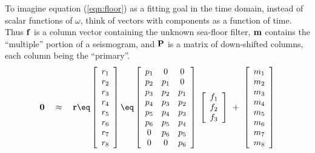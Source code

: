 \par
To imagine equation (\ref{eqn:floor})
as a fitting goal in the time domain,
instead of scalar functions of $\omega$,
think of vectors with components as a function of time.
Thus $\bold f$ is a column vector
containing the unknown sea-floor filter,
$\bold m$ 
contains the ``multiple'' portion of a seismogram,
and $\bold P$ is a matrix of down-shifted columns,
each column being the ``primary''.
\begin{equation}
\bold 0 \quad\approx\quad
\bold r \eq
\left[
\begin{array}{c}
  r_1 \\
  r_2 \\
  r_3 \\
  r_4 \\
  r_5 \\
  r_6 \\
  r_7 \\
  r_8
  \end{array} \right]
  \eq
\left[
\begin{array}{ccc}
  p_1 & 0   & 0    \\
  p_2 & p_1 & 0    \\
  p_3 & p_2 & p_1  \\
  p_4 & p_3 & p_2  \\
  p_5 & p_4 & p_3  \\
  p_6 & p_5 & p_4  \\
  0   & p_6 & p_5  \\
  0   & 0   & p_6
  \end{array} \right]
\; \left[
\begin{array}{c}
  f_1 \\
  f_2 \\
  f_3 \end{array} \right]
\ +\ 
\left[
\begin{array}{c}
  m_1 \\
  m_2 \\
  m_3 \\
  m_4 \\
  m_5 \\
  m_6 \\
  m_7 \\
  m_8
  \end{array} \right]
\label{eqn:findmult}
\end{equation}



